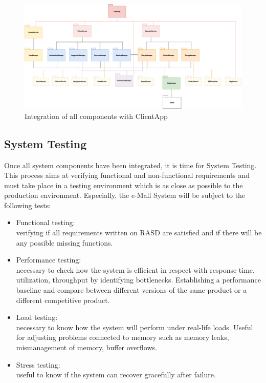 \documentclass[../main.tex]{subfiles}
\begin{document}
\begin{figure}[H]
    \centering
    \includegraphics[width=1.05\textwidth]{ImplementationDiagram/6.png}
    \caption{Integration of all components with ClientApp}
    \label{fig:impdiag}
\end{figure}


\newpage
\subsection{System Testing}
\noindent
Once all system components have been integrated, it is time for System Testing. This process aims at verifying functional and non-functional requirements and must take place in a testing environment which is as close as possible to the production environment. Especially, the e-Mall System will be subject to the following tests:
\begin{itemize}
    \item Functional testing:\\
    verifying if all requirements written on RASD are satisfied and if there will be any possible missing functions. 
    \item Performance testing: \\
    necessary to check how the system is efficient in respect with response time, utilization, throughput by identifying bottlenecks. Establishing a performance baseline and compare between different versions of the same product or a different competitive product.
    \item Load testing: \\
    necessary to know how the system will perform under real-life loads. Useful for adjusting problems connected to memory such as memory leaks, mismanagement of memory, buffer overflows. 
    \item Stress testing: \\
    useful to know if the system can recover gracefully after failure.
\end{itemize}
\end{document}
